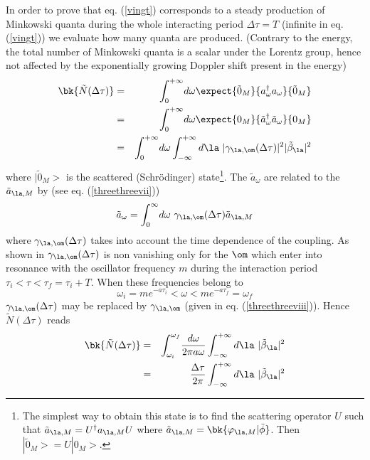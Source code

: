 \documentclass[12pt]{article}
\begin{document}
In order to prove that eq. (\ref{vingt})
corresponds to a steady production of Minkowski quanta
during
the whole interacting period $\Delta \tau =T$ (infinite in eq. (\ref{vingt}))
we evaluate how many quanta are produced.
(Contrary to the energy, the total number of Minkowski quanta
is a scalar under the Lorentz group, hence not affected by the exponentially
growing Doppler shift present in the energy)
 \begin{eqnarray}
\bk{\tilde N( \Delta \tau )}  &=&  \int_{0}^{+\infty}  \! d \omega
\expect{\tilde 0_M}{ a_{ \omega} ^\dagger a_{ \omega}}{ \tilde 0_M}
\nonumber\\ &=&  \int_{0}^{+\infty}  \! d \omega
\expect{0_M}{\tilde  a_{ \omega} ^\dagger
 \tilde a_{ \omega}}{0_M}
\nonumber\\ &=&  \int_{0}^{+\infty}  \! d \omega
 \int_{-\infty}^{+\infty}  d\la\ |  \gamma_{\la,\om}( \Delta \tau )|^2
| \tilde \beta_{\la}|^2
\label{vun}
\end{eqnarray}
where $ |\tilde0_M>$ is the scattered (Schr\"odinger) state\footnote{
The simplest way to obtain this state is to find the scattering operator
$U$ such that $\tilde a_{\la,M}= U ^\dagger a_{\la,M} U$ where
$\tilde a_{\la,M}= \bk{\varphi_{\la,M} \vert \tilde \phi}$. Then $
|\tilde 0_M > =U |0_M >$.}.
The $ \tilde a_{ \omega}$ are related to the $ \tilde a_{\la,M}$
by (see eq. (\ref{threethreevii}))
\begin{equation}
 \tilde a_{ \omega} = \int_0^{\infty}\! d\omega\ \gamma_{\la,\om}
( \Delta \tau )  \tilde a_{\la,M}
\label{vdeux}
\end{equation}
where $\gamma_{\la,\om}( \Delta \tau )$ takes into account the time
dependence of the
coupling. As shown in \cite{pbt,GO}
 $\gamma_{\la,\om}( \Delta \tau )$ is
non vanishing
only for the $\om$ which enter into resonance with the oscillator
frequency $m$ during the interaction period
 $ \tau_i <  \tau <
\tau_f = \tau_i + T$. When these frequencies belong to
\begin{equation}
 \omega_i = m e^{-a \tau_i} <  \omega <  m e^{-a \tau_f}= \omega_f
\label{vtrois}
\end{equation}
$ \gamma_{\la,\om}( \Delta \tau )$ may be
replaced by $ \gamma_{\la,\om}$ (given in eq. (\ref{threethreeviii})).
Hence $ \tilde N( \Delta \tau )$ reads
\begin{eqnarray}
\bk{\tilde N( \Delta \tau )} &=&  \int_{ \omega_i}^{ \omega_f}  \!
{d \omega \over 2 \pi a \omega}  \int_{-\infty}^{+\infty}  d\la\ | \tilde
\beta_{\la}|^2
\nonumber\\ &=&  { \Delta \tau \over 2 \pi} \int_{-\infty}^{+\infty}  d\la\ |
\tilde
\beta_{\la}|^2
\label{vquatre}
\end{eqnarray}
\end{document}
